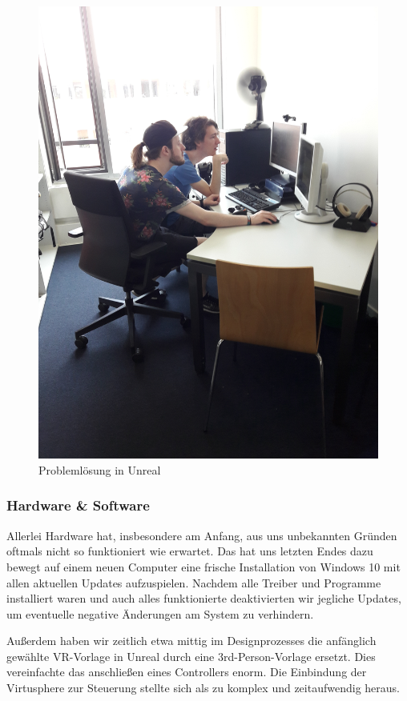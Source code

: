 \documentclass{Bericht}
\begin{document}
		\begin{figure}[!htbp] %
			\centering
			\includegraphics[trim = 200mm 0mm 600mm 0mm, clip, height=\linewidth, width=\textheight, keepaspectratio, angle=270]{../Bilder/20170619_102101.jpg} %
			\caption{Problemlösung in Unreal}
			\label{img:porblemloesung}
		\end{figure}
		
		\subsubsection{Hardware \& Software}
			Allerlei Hardware hat, insbesondere am Anfang, aus uns unbekannten Gründen oftmals nicht so funktioniert wie erwartet. Das hat uns letzten Endes dazu bewegt auf einem neuen Computer eine frische Installation von Windows 10 mit allen aktuellen Updates aufzuspielen. Nachdem alle Treiber und Programme installiert waren und auch alles funktionierte deaktivierten wir jegliche Updates, um eventuelle negative Änderungen am System zu verhindern. 
			
			Außerdem haben wir zeitlich etwa mittig im Designprozesses die anfänglich gewählte VR-Vorlage in Unreal durch eine 3rd-Person-Vorlage ersetzt. Dies vereinfachte das anschließen eines Controllers enorm. Die Einbindung der Virtusphere zur Steuerung stellte sich als zu komplex und zeitaufwendig heraus. 
		
\end{document}
